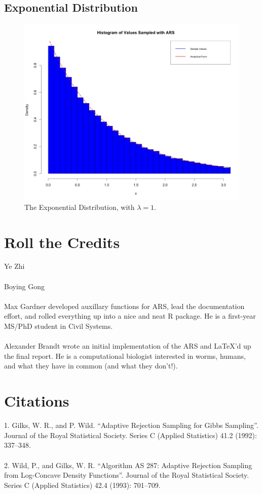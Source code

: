 \documentclass[12pt, oneside]{article}
\begin{document}
\subsection{Exponential Distribution}

\begin{figure}[H]
\centering
  \includegraphics[scale=.25]{figure/exponential.jpeg}
  \caption{The Exponential Distribution, with \(\lambda = 1\).}
  \label{fig:d3}
\end{figure}

\section{Roll the Credits}

Ye Zhi \\\\
Boying Gong \\\\
Max Gardner developed auxillary functions for ARS, lead the documentation effort, and rolled everything up into a nice and neat R package. He is a first-year MS/PhD student in Civil Systems.\\\\
Alexander Brandt wrote an initial implementation of the ARS and \LaTeX'd up the final report.  He is a computational biologist interested in worms, humans, and what they have in common (and what they don't!).\\

\section{Citations}
1. Gilks, W. R., and P. Wild. ``Adaptive Rejection Sampling for Gibbs Sampling''. Journal of the Royal Statistical Society. Series C (Applied Statistics) 41.2 (1992): 337--348.\\\\
2. Wild, P., and Gilks, W. R.  ``Algorithm AS 287: Adaptive Rejection Sampling from Log-Concave Density Functions''. Journal of the Royal Statistical Society. Series C (Applied Statistics) 42.4 (1993): 701--709.
\end{document}
